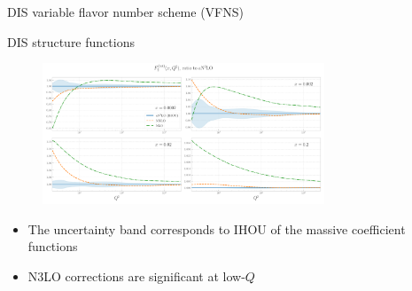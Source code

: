 \begin{frame}{DIS variable flavor number scheme (VFNS)}



\end{frame}


\begin{frame}{DIS structure functions}
  \begin{figure}[!t]
    \centering
    \includegraphics[width=0.75\textwidth]{figures/F2_total.pdf}
  \end{figure}
  \begin{itemize}
    \item The uncertainty band corresponds to IHOU of the massive coefficient functions
    \item N3LO corrections are significant at low-$Q$
  \end{itemize}
\end{frame}


